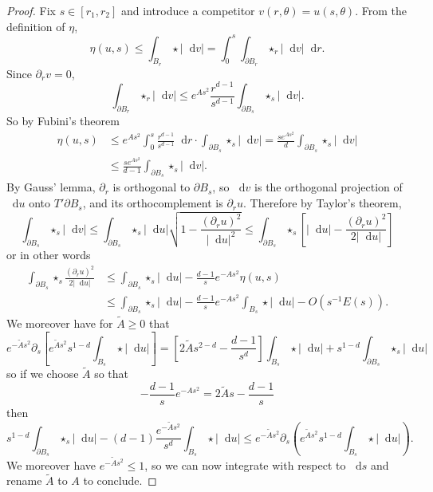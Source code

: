 \documentclass[reqno,11pt]{amsart}
\newcommand*\dif{\mathop{}\!\mathrm{d}}
\theoremstyle{definition}
\numberwithin{equation}{section}
\begin{document}
\begin{proof}
Fix $s \in [r_1, r_2]$ and introduce a competitor $v(r, \theta) = u(s, \theta)$.
From the definition of $\eta$,
$$\eta(u, s) \leq \int_{B_r} \star |\dif v| = \int_0^s \int_{\partial B_r} \star_r |\dif v| \dif r.$$
Since $\partial_r v = 0$,
$$\int_{\partial B_r} \star_r |\dif v| \leq e^{As^2} \frac{r^{d - 1}}{s^{d - 1}} \int_{\partial B_s} \star_s |\dif v|.$$
So by Fubini's theorem
\begin{align*}
\eta(u, s) &\leq e^{As^2} \int_0^s \frac{r^{d - 1}}{s^{d - 1}} \dif r \cdot \int_{\partial B_s} \star_s |\dif v| = \frac{s e^{As^2}}{d} \int_{\partial B_s} \star_s |\dif v|\\
&\leq \frac{s e^{As^2}}{d - 1} \int_{\partial B_s} \star_s |\dif v|.
\end{align*}
By Gauss' lemma, $\partial_r$ is orthogonal to $\partial B_s$, so $\dif v$ is the orthogonal projection of $\dif u$ onto $T' \partial B_s$, and its orthocomplement is $\partial_r u$. Therefore by Taylor's theorem,
$$\int_{\partial B_s} \star_s |\dif v| \leq \int_{\partial B_s} \star_s |\dif u| \sqrt{1 - \frac{(\partial_r u)^2}{|\dif u|^2}} \leq \int_{\partial B_s} \star_s \left[|\dif u| - \frac{(\partial_r u)^2}{2 |\dif u|}\right]$$
or in other words
\begin{align*}
\int_{\partial B_s} \star_s \frac{(\partial_r u)^2}{2|\dif u|} &\leq \int_{\partial B_s} \star_s |\dif u| - \frac{d - 1}{s} e^{-As^2} \eta(u, s)\\
&\leq \int_{\partial B_s} \star_s |\dif u| - \frac{d - 1}{s} e^{-As^2} \int_{B_s} \star |\dif u| - O(s^{-1}E(s)).
\end{align*}
We moreover have for $\tilde A \geq 0$ that
$$e^{-\tilde As^2} \partial_s \left[e^{\tilde As^2} s^{1 - d} \int_{B_s} \star |\dif u|\right] = \left[2\tilde As^{2 - d} - \frac{d - 1}{s^d}\right]\int_{B_s} \star |\dif u| + s^{1 - d} \int_{\partial B_s} \star_s |\dif u|$$
so if we choose $\tilde A$ so that
$$-\frac{d - 1}{s} e^{-As^2} = 2\tilde As - \frac{d - 1}{s}$$
then
$$s^{1 - d} \int_{\partial B_s} \star_s |\dif u| - (d - 1)\frac{e^{-\tilde As^2}}{s^d} \int_{B_s} \star|\dif u| \leq e^{-\tilde As^2} \partial_s\left(e^{\tilde As^2} s^{1 - d} \int_{B_s} \star|\dif u|\right).$$
We moreover have $e^{-\tilde As^2} \leq 1$, so we can now integrate with respect to $\dif s$ and rename $\tilde A$ to $A$ to conclude.
\end{proof}
\end{document}
